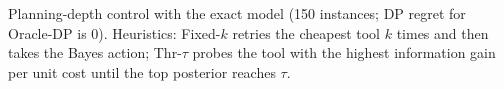 \begin{table}[!htbp]
\centering\scriptsize\setlength{\tabcolsep}{3pt}
\caption{Planning-depth control with the exact model (150 instances; DP regret for Oracle-DP is 0). Heuristics: Fixed-$k$ retries the cheapest tool $k$ times and then takes the Bayes action; Thr-$\tau$ probes the tool with the highest information gain per unit cost until the top posterior reaches $\tau$.}
\label{tab:app-x6}
\resizebox{\linewidth}{!}{}
\end{table}
